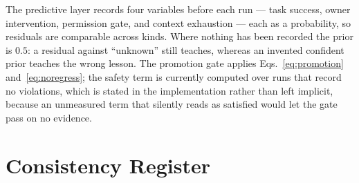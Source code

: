 \documentclass[11pt]{article}
\begin{document}
The predictive layer records four variables before each run --- task success, owner intervention, permission gate, and context exhaustion --- each as a probability, so residuals are comparable across kinds. Where nothing has been recorded the prior is $0.5$: a residual against ``unknown'' still teaches, whereas an invented confident prior teaches the wrong lesson. The promotion gate applies Eqs.~\eqref{eq:promotion} and~\eqref{eq:noregress}; the safety term is currently computed over runs that record no violations, which is stated in the implementation rather than left implicit, because an unmeasured term that silently reads as satisfied would let the gate pass on no evidence.

\section{Consistency Register}
\label{app:register}
\end{document}

